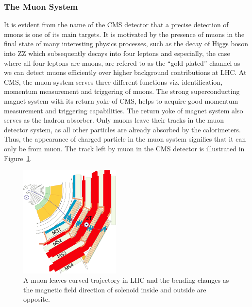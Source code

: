 

\subsubsection{The Muon System} %
\label{sub:the_muon_system}
It is evident  from the name of the CMS detector that a precise detection of muons is one of its main targets. It is motivated by the presence of muons in the final state of many interesting physics processes, such as the decay of Higgs boson into ZZ which subsequently decays into four leptons and especially, the case where all four leptons are muons, are refered to as the ``gold plated'' channel as we can detect muons efficiently over higher background contributions at LHC. At CMS, the muon system serves three different functions viz. identification, momentum measurement and triggering of muons. The strong superconducting magnet system with its return yoke of CMS, helps to acquire good momentum measurement and triggering capabilities. The return yoke of magnet system also serves as the hadron absorber. Only muons leave their tracks in the muon detector system, as all other particles are already absorbed by the calorimeters. Thus, the appearance of charged particle in the muon system signifies that it can only be from muon. The track left by muon in the CMS detector is illustrated in Figure~\ref{fig:muon-system-cross}. 
\begin{figure}[!htbp]
	\centering
	\includegraphics[width=0.45\textwidth]{figures/LHC/MuStations.png}
	\caption{A muon leaves curved trajectory in LHC and the bending changes as the magnetic field direction of solenoid inside and outside are opposite.}
	\label{fig:muon-system-cross}
\end{figure}
